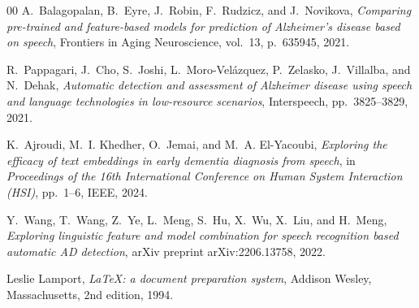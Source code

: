 \documentclass[final,5p,times]{elsarticle}
\begin{document}
\begin{thebibliography}{00}
A.~Balagopalan, B.~Eyre, J.~Robin, F.~Rudzicz, and J.~Novikova,
\textit{Comparing pre-trained and feature-based models for prediction of Alzheimer's disease based on speech},
Frontiers in Aging Neuroscience,
vol.~13,
p.~635945,
2021.

R.~Pappagari, J.~Cho, S.~Joshi, L.~Moro-Vel{\'a}zquez, P.~Zelasko, J.~Villalba, and N.~Dehak,
\textit{Automatic detection and assessment of Alzheimer disease using speech and language technologies in low-resource scenarios},
Interspeech,
pp.~3825--3829,
2021.

K.~Ajroudi, M.~I. Khedher, O.~Jemai, and M.~A. El-Yacoubi,
\textit{Exploring the efficacy of text embeddings in early dementia diagnosis from speech},
in \textit{Proceedings of the 16th International Conference on Human System Interaction (HSI)},
pp.~1--6,
IEEE,
2024.

Y.~Wang, T.~Wang, Z.~Ye, L.~Meng, S.~Hu, X.~Wu, X.~Liu, and H.~Meng,
\textit{Exploring linguistic feature and model combination for speech recognition based automatic AD detection},
arXiv preprint arXiv:2206.13758,
2022.



  Leslie Lamport,
  \textit{\LaTeX: a document preparation system},
  Addison Wesley, Massachusetts,
  2nd edition,
  1994.

\end{thebibliography}
\end{document}
